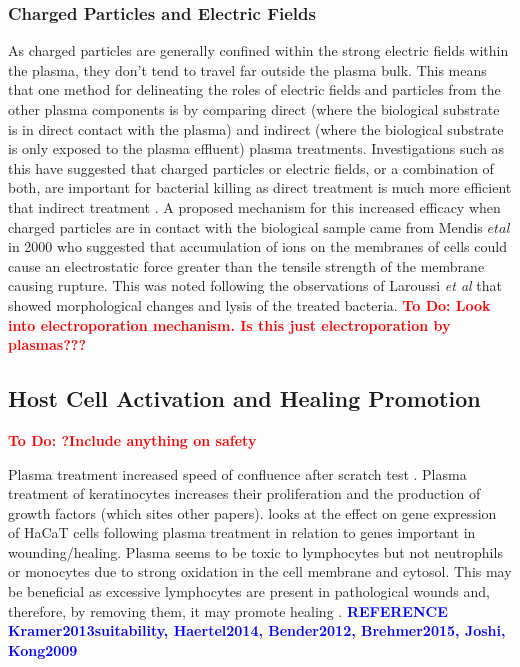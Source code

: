 \documentclass[11pt, oneside]{article}   	%
\newcommand{\todo}[1]{ \textcolor{red}{\bf{To Do:} #1}}
\newcommand{\toref}[1]{ \textcolor{blue}{\bf{REFERENCE #1}}}
\begin{document}
\subsubsection{Charged Particles and Electric Fields}
As charged particles are generally confined within the strong electric fields within the plasma, they don't tend to travel far outside the plasma bulk.
This means that one method for delineating the roles of electric fields and particles from the other plasma components is by comparing direct (where the biological substrate is in direct contact with the plasma) and indirect (where the biological substrate is only exposed to the plasma effluent) plasma treatments.
Investigations such as this have suggested that charged particles or electric fields, or a combination of both, are important for bacterial killing as direct treatment is much more efficient that indirect treatment \cite{Fridman2007comparison}.
A proposed mechanism for this increased efficacy when charged particles are in contact with the biological sample came from Mendis $et al$ in 2000 \cite{Mendis2000a} who suggested that accumulation of ions on the membranes of cells could cause an electrostatic force greater than the tensile strength of the membrane causing rupture.
This was noted following the observations of Laroussi \textit{et al} \cite{Laroussi1999images} that showed morphological changes and lysis of the treated bacteria.
\todo{Look into electroporation mechanism. Is this just electroporation by plasmas???}

\subsection{Host Cell Activation and Healing Promotion}
\todo{?Include anything on safety}

Plasma treatment increased speed of confluence after scratch test \cite{Tipa2011plasma}.
Plasma treatment of keratinocytes increases their proliferation and the production of growth factors \cite{Bekeschus2016the} (which sites other papers).
\cite{Barton2013nonthermal} looks at the effect on gene expression of HaCaT cells following plasma treatment in relation to genes important in wounding/healing.
Plasma seems to be toxic to lymphocytes but not neutrophils or monocytes due to strong oxidation in the cell membrane and cytosol. This may be beneficial as excessive lymphocytes are present in pathological wounds and, therefore, by removing them, it may promote healing \cite{Bekeschus2016the}.
\toref{Kramer2013suitability, Haertel2014, Bender2012, Brehmer2015, Joshi, Kong2009}
\end{document}
